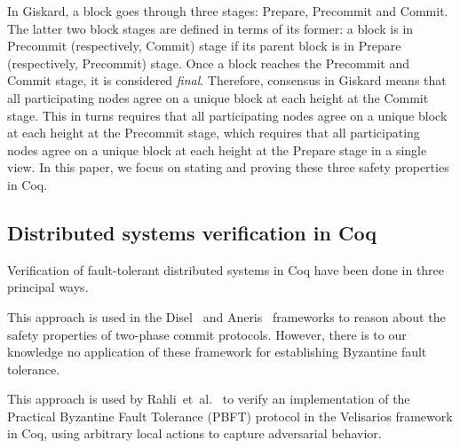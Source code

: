 \documentclass{easychair}
\begin{document}

In Giskard, a block goes through three stages: Prepare, Precommit and Commit. The latter two block stages are defined in terms of its former: a block is in Precommit (respectively, Commit) stage if its parent block is in Prepare (respectively, Precommit) stage. Once a block reaches the Precommit and Commit stage, it is considered \emph{final}. Therefore, consensus in Giskard means that all participating nodes agree on a unique block at each height at the Commit stage. This in turns requires that all participating nodes agree on a unique block at each height at the Precommit stage, which requires that all participating nodes agree on a unique block at each height at the Prepare stage in a single view. In this paper, we focus on stating and proving these three safety properties in Coq.

\subsection{Distributed systems verification in Coq}
Verification of fault-tolerant distributed systems in Coq have been done in three principal ways.

 This approach is used in the Disel~\cite{Sergey2018} and Aneris~\cite{Krogh2020} frameworks to reason about the safety properties of two-phase commit protocols. However, there is to our knowledge no application of these framework for establishing Byzantine fault tolerance.

 This approach is used by Rahli~et~al.~\cite{Rahli2018} to verify an implementation of the Practical Byzantine Fault Tolerance (PBFT) protocol in the Velisarios framework in Coq, using arbitrary local actions to capture adversarial behavior.
\end{document}
